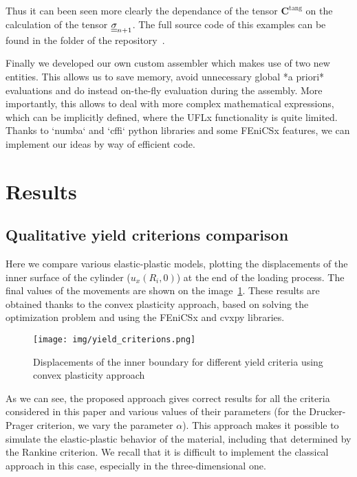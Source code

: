 \documentclass[12pt]{article}
\begin{document}
Thus it can been seen more clearly the dependance of the tensor $\mathbf{C}^\text{tang}$ on the calculation of the tensor $\underline{\underline{\sigma}}_{n+1}$. The full source code of this examples can be found in the  folder of the repository~\parencite{convex-plasticity}.

Finally we developed our own custom assembler which makes use of two new entities. This allows us to save memory, avoid unnecessary global *a priori* evaluations and do instead on-the-fly evaluation during the assembly. More importantly, this allows to deal with more complex mathematical expressions, which can be implicitly defined, where the UFLx functionality is quite limited. Thanks to `numba` and `cffi` python libraries and some FEniCSx features, we can implement our ideas by way of efficient code. 

\newpage
\section{Results}

\subsection{Qualitative yield criterions comparison}

Here we compare various elastic-plastic models, plotting the displacements of the inner surface of the cylinder ($u_x(R_i, 0)$) at the end of the loading process. The final values of the movements are shown on the image~\ref{fig:yield_criteria}. These results are obtained thanks to the convex plasticity approach, based on solving the optimization problem and using the FEniCSx and cvxpy libraries.
\begin{figure}[H]
    \center
    \texttt{[image: img/yield\_criterions.png]}
    \caption{Displacements of the inner boundary for different yield criteria using convex plasticity approach}
    \label{fig:yield_criteria}
\end{figure}
As we can see, the proposed approach gives correct results for all the criteria considered in this paper and various values of their parameters (for the Drucker-Prager criterion, we vary the parameter $\alpha$). This approach makes it possible to simulate the elastic-plastic behavior of the material, including that determined by the Rankine criterion. We recall that it is difficult to implement the classical approach in this case, especially in the three-dimensional one.
\end{document}
